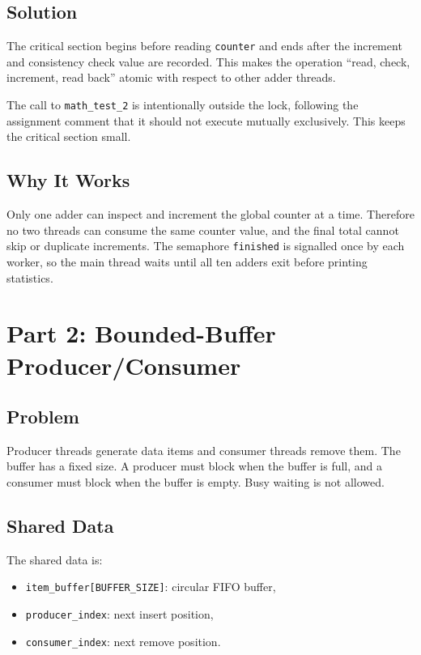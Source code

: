 \documentclass[12pt,a4paper]{article}
\begin{document}
\subsection{Solution}

The critical section begins before reading \texttt{counter} and ends after the
increment and consistency check value are recorded. This makes the operation
``read, check, increment, read back'' atomic with respect to other adder
threads.

The call to \texttt{math\_test\_2} is intentionally outside the lock, following
the assignment comment that it should not execute mutually exclusively. This
keeps the critical section small.

\subsection{Why It Works}

Only one adder can inspect and increment the global counter at a time. Therefore
no two threads can consume the same counter value, and the final total cannot
skip or duplicate increments. The semaphore \texttt{finished} is signalled once
by each worker, so the main thread waits until all ten adders exit before
printing statistics.

\section{Part 2: Bounded-Buffer Producer/Consumer}

\subsection{Problem}

Producer threads generate data items and consumer threads remove them. The
buffer has a fixed size. A producer must block when the buffer is full, and a
consumer must block when the buffer is empty. Busy waiting is not allowed.

\subsection{Shared Data}

The shared data is:

\begin{itemize}
    \item \texttt{item\_buffer[BUFFER\_SIZE]}: circular FIFO buffer,
    \item \texttt{producer\_index}: next insert position,
    \item \texttt{consumer\_index}: next remove position.
\end{itemize}
\end{document}
